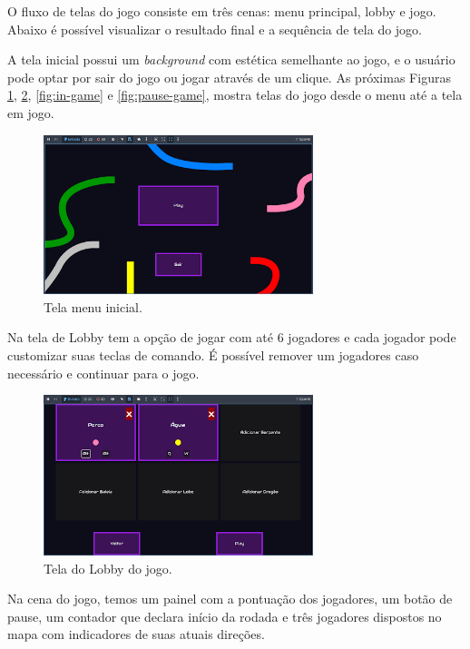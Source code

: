O fluxo de telas do jogo consiste em três cenas: menu principal, lobby e jogo. Abaixo é possível visualizar o resultado final e a sequência de tela do jogo.

A tela inicial possui um \textit{background} com estética semelhante ao jogo, e o usuário pode optar por sair do jogo ou jogar através de um clique. As próximas Figuras \ref{fig:menu-inical}, \ref{fig:menu-lobby}, \ref{fig:in-game} e \ref{fig:pause-game}, mostra telas do jogo desde o menu até a tela em jogo.

\begin{figure}[htbp]
    \centering
    \caption{Tela menu inicial.}
    \label{fig:menu-inical}
    \includegraphics[width=0.7\textwidth]{figuras/menu-game.png}
\end{figure}

Na tela de Lobby tem a opção de jogar com até 6 jogadores e cada jogador pode customizar suas teclas de comando. É possível remover um jogadores caso necessário e continuar para o jogo.

\begin{figure}[htbp]
    \centering
    \caption{Tela do Lobby do jogo.}
    \label{fig:menu-lobby}
    \includegraphics[width=0.7\textwidth]{figuras/lobby-game.png}
\end{figure}

Na cena do jogo, temos um painel com a pontuação dos jogadores, um botão de pause, um contador que declara início da rodada e três jogadores dispostos no mapa com indicadores de suas atuais direções.

